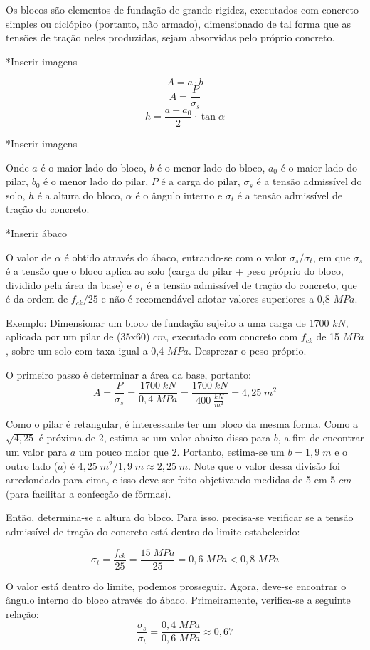 Os blocos são elementos de fundação de grande rigidez, executados com concreto simples ou ciclópico (portanto, não armado), dimensionado de tal forma que as tensões de tração neles produzidas, sejam absorvidas pelo próprio concreto.

*Inserir imagens

$$A=a\cdot b$$ $$A=\frac{P}{\sigma_s}$$ $$h=\frac{a-a_0}{2}\cdot \tan{\alpha}$$

*Inserir imagens

Onde $a$ é o maior lado do bloco, $b$ é o menor lado do bloco, $a_0$ é o maior lado do pilar, $b_0$ é o menor lado do pilar, $P$ é a carga do pilar, $\sigma_s$ é a tensão admissível do solo, $h$ é a altura do bloco, $\alpha$ é o ângulo interno e $\sigma_t$ é a tensão admissível de tração do concreto.

*Inserir ábaco

O valor de $\alpha$ é obtido através do ábaco, entrando-se com o valor $\sigma_s/\sigma_t$, em que $\sigma_s$ é a tensão que o bloco aplica ao solo (carga do pilar + peso próprio do bloco, dividido pela área da base) e $\sigma_t$ é a tensão admissível de tração do concreto, que é da ordem de $f_{ck}/25$ e não é recomendável adotar valores superiores a 0,8 $MPa$.

Exemplo: Dimensionar um bloco de fundação sujeito a uma carga de 1700 $kN$, aplicada por um pilar de (35x60) $cm$, executado com concreto com $f_{ck}$ de 15 $MPa$, sobre um solo com taxa igual a 0,4 $MPa$. Desprezar o peso próprio.

O primeiro passo é determinar a área da base, portanto: $$A=\frac{P}{\sigma_s}=\frac{1700\;kN}{0,4\;MPa}=\frac{1700\;kN}{400\;\frac{kN}{m^2}}=4,25\;m^2$$

Como o pilar é retangular, é interessante ter um bloco da mesma forma. Como a $\sqrt{4,25}$ é próxima de 2, estima-se um valor abaixo disso para $b$, a fim de encontrar um valor para $a$ um pouco maior que 2. Portanto, estima-se um $b=1,9\;m$ e o outro lado ($a$) é $4,25\;m^2/1,9\;m\approx 2,25\;m$. Note que o valor dessa divisão foi arredondado para cima, e isso deve ser feito objetivando medidas de 5 em 5 $cm$ (para facilitar a confecção de fôrmas).

Então, determina-se a altura do bloco. Para isso, precisa-se verificar se a tensão admissível de tração do concreto está dentro do limite estabelecido:

$$\sigma_t=\frac{f_{ck}}{25}=\frac{15\;MPa}{25}=0,6\;MPa < 0,8\;MPa$$

O valor está dentro do limite, podemos prosseguir. Agora, deve-se encontrar o ângulo interno do bloco através do ábaco. Primeiramente, verifica-se a seguinte relação: $$\frac{\sigma_s}{\sigma_t}=\frac{0,4\;MPa}{0,6\;MPa}\approx 0,67$$

